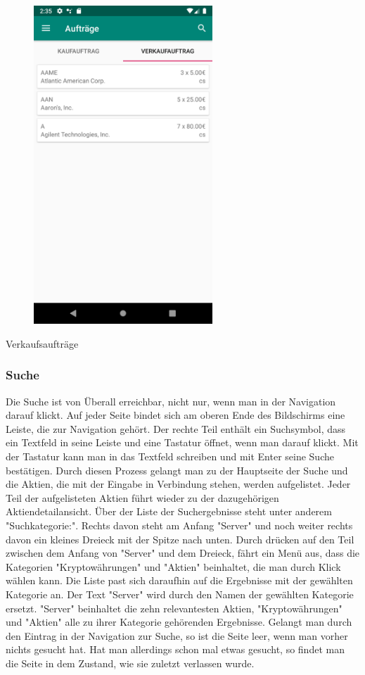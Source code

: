 \documentclass[10pt]{scrartcl}
\begin{document}
\begin{figure}[H]
	\centering
	\includegraphics[width=0.6\textwidth]{Bilder/Applikation/Verkaufauftrag.png}
\end{figure}
Verkaufsaufträge

\subsubsection{Suche}
Die Suche ist von Überall erreichbar, nicht nur, wenn man in der Navigation darauf klickt. Auf jeder Seite bindet sich am oberen Ende des Bildschirms eine Leiste, die zur Navigation gehört. Der rechte Teil enthält ein Suchsymbol, dass ein Textfeld in seine Leiste und eine Tastatur öffnet, wenn man darauf klickt. Mit der Tastatur kann man in das Textfeld schreiben und mit Enter seine Suche bestätigen. Durch diesen Prozess gelangt man zu der Hauptseite der Suche und die Aktien, die mit der Eingabe in Verbindung stehen, werden aufgelistet. Jeder Teil der aufgelisteten Aktien führt wieder zu der dazugehörigen Aktiendetailansicht. Über der Liste der Suchergebnisse steht unter anderem "Suchkategorie:". Rechts davon steht am Anfang "Server" und noch weiter rechts davon ein kleines Dreieck mit der Spitze nach unten. Durch drücken auf den Teil zwischen dem Anfang von "Server" und dem Dreieck, fährt ein Menü aus, dass die Kategorien "Kryptowährungen" und "Aktien" beinhaltet, die man durch Klick wählen kann. Die Liste past sich daraufhin auf die Ergebnisse mit der gewählten Kategorie an. Der Text "Server" wird durch den Namen der gewählten Kategorie ersetzt. 
"Server" beinhaltet die zehn relevantesten Aktien, "Kryptowährungen" und "Aktien" alle zu ihrer Kategorie gehörenden Ergebnisse.
Gelangt man durch den Eintrag in der Navigation zur Suche, so ist die Seite leer, wenn man vorher nichts gesucht hat. Hat man allerdings schon mal etwas gesucht, so findet man die Seite in dem Zustand, wie sie zuletzt verlassen wurde.
\end{document}
